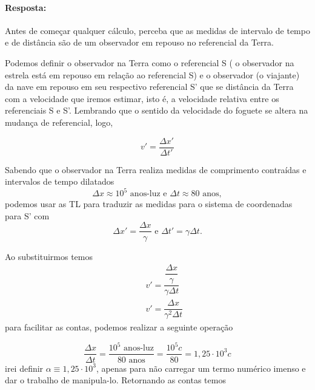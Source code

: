\documentclass[10pt,a4paper]{article}
\begin{document}
	\paragraph{Resposta:}
	Antes de começar qualquer cálculo, perceba que as medidas de intervalo de tempo e de distância são de um observador em repouso no referencial da Terra.
	
	Podemos definir o observador na Terra como o referencial S ( o observador na estrela está em repouso em relação ao referencial S) e o observador (o viajante) da nave em repouso em seu respectivo referencial S' que se distância da Terra com a velocidade que iremos estimar, isto é, a velocidade relativa entre os referenciais S e S'. Lembrando que o sentido da velocidade do foguete se altera na mudança de referencial, logo,
	
	\begin{equation}\label{v_foguete}
		  v' = \dfrac{\Delta x'}{\Delta t'}
	\end{equation}
	
	Sabendo que o observador na Terra realiza medidas de comprimento contraídas e intervalos de tempo dilatados
	\begin{equation}
		\Delta x \approx 10^5 \text{  anos-luz    e  } \Delta t \approx \text{80 anos},
	\end{equation}
	podemos usar as TL para traduzir as medidas para o sistema de coordenadas para S' com
	\begin{equation}\label{TL_repouso}
		\Delta x' = \dfrac{\Delta x}{\gamma}\text{  e  } \Delta t' = \gamma\Delta t.
	\end{equation}

	Ao substituirmos temos
	\begin{eqnarray}
		&& v' = \dfrac{\dfrac{\Delta x}{\gamma}}{\gamma\Delta t} \nonumber \\
		&& v' = \dfrac{\Delta x}{\gamma^2\Delta t}\nonumber
	\end{eqnarray}
	para facilitar as contas, podemos realizar a seguinte operação
	
	\begin{equation}\nonumber
		\dfrac{\Delta x}{\Delta t } = \dfrac{10^5 \text{  anos-luz}}{80\text{ anos}} = \dfrac{10^5c}{80} = 1,25\cdot10^3c
	\end{equation}
	irei definir $ \alpha\equiv 1,25\cdot10^3 $, apenas para não carregar um termo numérico imenso e dar o trabalho de manipula-lo. Retornando as contas temos
	
\end{document}
